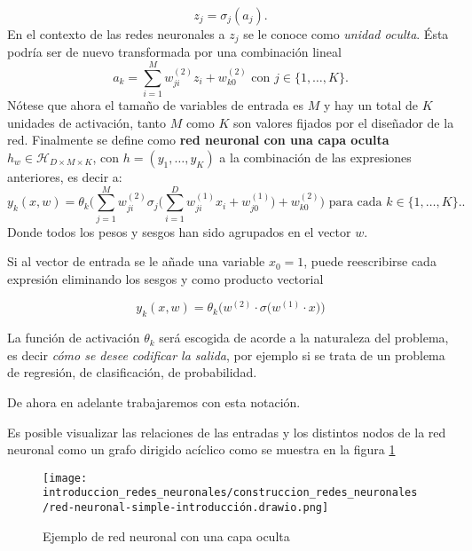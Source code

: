 \begin{equation}
    z_j = \sigma_j(a_j).
\end{equation}
En el contexto de las redes neuronales a $z_j$ se le conoce como \textit{unidad oculta}. Ésta  podría ser de 
nuevo  transformada por una combinación lineal 
\begin{equation}
    a_k = \sum_{i=1}^M w_{ji}^{(2)} z_i + w_{k0}^{(2)}
    \text{ con } j \in \{1, \ldots, K \}.
\end{equation}
Nótese que ahora el tamaño de variables de entrada es $M$
y hay un total de $K$ unidades de activación, tanto $M$ como $K$ son
valores fijados por el diseñador de la red. 
Finalmente se define como \textbf{red neuronal con una capa oculta} $h_w \in \mathcal{H}_{D \times M \times K}$, con $h=(y_1, \ldots, y_K)$ a la combinación de las expresiones anteriores, es decir a: 
\begin{equation}
    y_k(x,w) = \theta_k 
    \biggl( 
        \sum^M_{j=1} w_{ji}^{(2)}
        \sigma_j 
        \biggl(
            \sum_{i=1}^D w_{ji}^{(1)} x_i + w_{j0}^{(1)}
        \biggr)
        + w_{k0}^{(2)}
    \biggr) 
    \text{ para cada  } k \in \{1, \ldots, K \}..
\end{equation}
Donde todos los pesos y sesgos han sido agrupados en el vector $w$. 

Si al vector de entrada se le añade una variable $x_0 = 1$, puede reescribirse cada expresión eliminando los sesgos y como producto vectorial

\begin{equation}
    y_k(x,w) = \theta_k 
    \bigl(
         w^{(2)} \cdot
        \sigma    
        \bigl(
             w^{(1)} \cdot x 
        \bigr)
    \bigr)
\end{equation}  

La función de activación $\theta_k$ será escogida de acorde a la
naturaleza del problema, es decir \textit{cómo se desee codificar la salida}, por ejemplo si se trata de un problema de regresión, de clasificación, de probabilidad. 
 
De ahora en adelante trabajaremos con esta notación. 

Es posible visualizar las relaciones de las entradas y los distintos nodos de la 
red neuronal como un grafo dirigido acíclico como se muestra en la figura \ref{img:ejemplo topología red neuronal}

\begin{figure}[h!] 
    \centering
    \texttt{[image: introduccion\_redes\_neuronales/construccion\_redes\_neuronales/red-neuronal-simple-introducción.drawio.png]}
    \caption{Ejemplo de red neuronal con una capa oculta}
    \label{img:ejemplo topología red neuronal}
\end{figure} 
 


